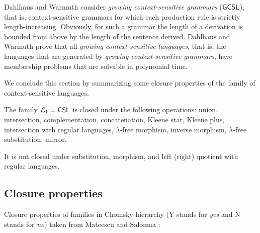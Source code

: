 Dahlhaus and Warmuth \cite{DW86} consider \emph{growing context-sensitive grammars} \index{$\GCSL$}($\GCSL$), that is,  context-sensitive grammars for which each production rule is strictly length-increasing. Obviously, for such a grammar the length of a derivation is bounded from above by the length of the sentence derived. Dahlhaus and Warmuth prove that all \emph{growing context-sensitive languages}, that is, the languages that are generated by \emph{growing context-sensitive grammars}, have membership problems that are solvable in polynomial time.

We conclude this section by summarizing some closure properties of the family of context-sensitive languages.

\begin{theorem}
The family $\mathcal{L}_1 = \CSL$ is closed under the following operations: union, intersection, complementation, concatenation, Kleene star, Kleene plus, intersection with regular languages, $\lambda$-free morphism, inverse morphism, $\lambda$-free substitution, mirror. 

It is not closed under substitution, morphism, and left (right) quotient with regular languages.
\end{theorem}

\subsection{Closure properties}
\label{subsection:closure-properties}

Closure properties of families in Chomsky hierarchy 
(Y stands for \emph{yes} and N stands for \emph{no}) taken from 
Mateescu and Salomaa \cite{MaSa1997formal}:

